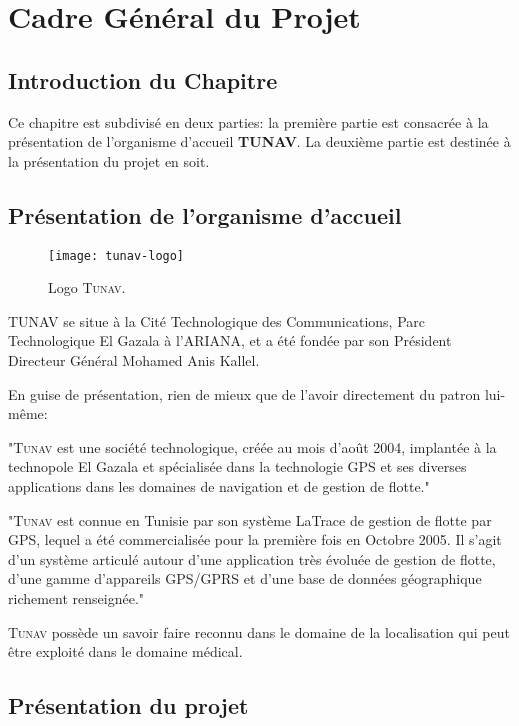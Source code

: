 
\chapter{Cadre Général du Projet}

\section{Introduction du Chapitre}

Ce chapitre est subdivisé en deux parties: la première partie est
consacrée à la présentation de l’organisme d’accueil \textbf{TUNAV}. La
deuxième partie est destinée à la présentation du projet en soit.

\section{Présentation de l'organisme d'accueil}  

\begin{figure}
\center
\texttt{[image: tunav-logo]}
\caption{Logo \textsc{Tunav}.}
\end{figure}

TUNAV se situe à la Cité Technologique des Communications, Parc
Technologique El Gazala à l’ARIANA, et a été fondée par son Président
Directeur Général Mohamed Anis Kallel.

En guise de présentation, rien de mieux que de l’avoir directement du patron lui-même\cite{index_tunisie}:

"\textsc{Tunav} est une société technologique, créée au mois d’août
2004, implantée à la technopole El Gazala et spécialisée dans la
technologie GPS et ses diverses applications dans les domaines de
navigation et de gestion de flotte."

"\textsc{Tunav} est connue en Tunisie par son système \og{}LaTrace\fg{}
de gestion de flotte par GPS, lequel a été commercialisée pour la
première fois en Octobre 2005. Il s'agit d'un système articulé autour
d'une application très évoluée de gestion de flotte, d'une gamme
d'appareils GPS/GPRS et d'une base de données géographique richement
renseignée."

\textsc{Tunav} possède un savoir faire reconnu dans le domaine de la
localisation qui peut être exploité dans le domaine médical.

\section{Présentation du projet}

